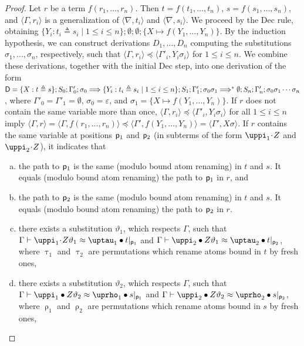 \documentclass{llncs}
\newcommand{\Lra}{\Longrightarrow}
\newcommand{\permap}{{\mkern 1mu\cdot \mkern 1mu}}
\newcommand{\permef}{\bullet}
\newcommand\pos{{\sf p}}
\newcommand\ppi{\uppi}
\newcommand\prho{\uprho}
\newcommand\ptau{\uptau}
\newcommand{\np}[2]{\langle #1, \allowbreak #2\rangle}
\begin{document}
\begin{proof}
Let $r$ be a term $f(r_1,\ldots,r_n)$. Then $t=f(t_1,\ldots,t_n)$, $s=f(s_1,\ldots,s_n)$, and $\np{\Gamma}{r_i}$ is a generalization of $\np{\nabla}{t_i}$ and $\np{\nabla}{s_i}$. We proceed by the {\sf Dec} rule, obtaining $\{Y_i : t_i\triangleq s_i \mid 1\le i\le n\};\emptyset;\emptyset;\{X\mapsto f(Y_1,\ldots,Y_n)\}$. By the induction hypothesis, we can construct derivations $D_1,\ldots,D_n$ computing the substitutions $\sigma_1,\ldots,\sigma_n$, respectively, such that $\np{\Gamma}{r_i}\preceq \np{\Gamma'_i}{Y_i\sigma_i}$ for $1\le i \le n$. We combine these derivations, together with the initial \textsf{Dec} step, into one derivation of the form ${\sf D} = \{X:t \triangleq s \};S_0;\Gamma'_0;\sigma_0\Lra \{Y_i:t_i \triangleq s_i \mid 1\le i \le n\};S_1;\Gamma'_1;\sigma_0\sigma_1 \Lra^* \emptyset; S_n; \Gamma'_n; \sigma_0\sigma_1\cdots\sigma_n$, where $\Gamma'_0=\Gamma'_1=\emptyset$, $\sigma_0=\varepsilon$, and $\sigma_1= \{X\mapsto f(Y_1,\ldots,Y_n)\}$. If $r$ does not contain the same variable more than once, $\np{\Gamma}{r_i}\preceq \np{\Gamma'_i}{Y_i\sigma_i}$ for all $1\le i \le n$ imply $\np{\Gamma}{r} = \np{\Gamma}{f(r_1,\ldots,r_n)} \preceq \np{\Gamma'}{f(Y_1,\ldots,Y_n)} = \np{\Gamma'}{X\sigma}$. If $r$ contains the same variable at positions $\pos_1$ and $\pos_2$ (in subterms of the form $\ppi_1\permap Z$ and $\ppi_2\permap Z$), it indicates that
\begin{enumerate}[(a)]
  \item\label{a} the path to $\pos_1$ is the same (modulo bound atom renaming) in $t$ and $s$. It equals (modulo bound atom renaming) the path to $\pos_1$ in $r$, and
  \item\label{b} the path to $\pos_2$ is the same (modulo bound atom renaming) in $t$ and $s$. It equals (modulo bound atom renaming) the path to $\pos_2$ in $r$.
  \item\label{c} there exists a substitution $\vartheta_1$, which respects $\Gamma$, such that $\Gamma \vdash \ppi_1\permap Z\vartheta_1 \approx \ptau_1\permef t|_{\pos_1}$ and $\Gamma \vdash \ppi_2\permef Z\vartheta_1 \approx \ptau_2\permef t|_{\pos_2}$, where $\ptau_1$ and $\ptau_2$ are permutations which rename atoms bound in $t$ by fresh ones,
  \item\label{d} there exists a substitution $\vartheta_2$, which respects $\Gamma$, such that $\Gamma \vdash \ppi_1\permef Z\vartheta_2 \approx \prho_1\permef s|_{\pos_1}$ and $\Gamma \vdash \ppi_2\permef Z\vartheta_2 \approx \prho_2\permef s|_{\pos_2}$, where $\prho_1$ and $\prho_2$ are permutations which rename atoms bound in $s$ by fresh ones,
\end{enumerate}


\end{proof}
\end{document}
